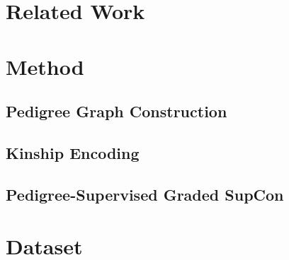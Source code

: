 \documentclass[review,3p]{elsarticle}
\begin{document}
\section{Related Work}
\label{sec:related}

\section{Method}
\label{sec:method}
\subsection{Pedigree Graph Construction}

\subsection{Kinship Encoding}

\subsection{Pedigree-Supervised Graded SupCon}

\section{Dataset}
\label{sec:dataset}
\end{document}
